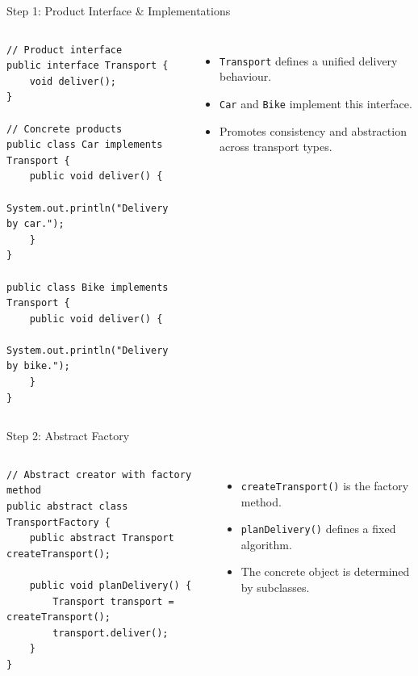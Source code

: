 \documentclass[aspectratio=169, table]{beamer}
\begin{document}
\begin{frame}[fragile]{Step 1: Product Interface \& Implementations}
\vspace{5pt}
\begin{columns}[T]
\begin{lstlisting}[style=JavaStyle]
// Product interface
public interface Transport {
	void deliver();
}

// Concrete products
public class Car implements Transport {
	public void deliver() {
		System.out.println("Delivery by car.");
	}
}

public class Bike implements Transport {
	public void deliver() {
		System.out.println("Delivery by bike.");
	}
}
\end{lstlisting}

\begin{itemize}
\item \texttt{Transport} defines a unified delivery behaviour.
\item \texttt{Car} and \texttt{Bike} implement this interface.
\item Promotes consistency and abstraction across transport types.
\end{itemize}
\end{columns}
\end{frame}

\begin{frame}[fragile]{Step 2: Abstract Factory}
\vspace{5pt}
\begin{columns}[T]
\begin{lstlisting}[style=JavaStyle]
// Abstract creator with factory method
public abstract class TransportFactory {
	public abstract Transport createTransport();
	
	public void planDelivery() {
		Transport transport = createTransport();
		transport.deliver();
	}
}
\end{lstlisting}

\begin{itemize}
\item \texttt{createTransport()} is the factory method.
\item \texttt{planDelivery()} defines a fixed algorithm.
\item The concrete object is determined by subclasses.
\end{itemize}
\end{columns}
\end{frame}
\end{document}
